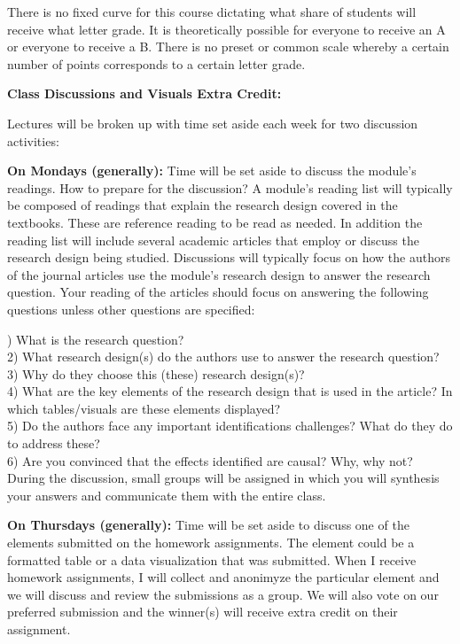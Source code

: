 \documentclass[a4paper, 10pt]{article}
\begin{document}
\noindent There is no fixed curve for this course dictating what share of students will receive what letter grade. It is theoretically possible for everyone to receive an A or everyone to receive a B. There is no preset or common scale whereby a certain number of points corresponds to a certain letter grade.  

\noindent\textbf{Class Discussions and Visuals Extra Credit:}

\noindent Lectures will be broken up with time set aside each week for two discussion activities:
 
\noindent \textbf{On Mondays (generally):} Time will be set aside to discuss the module's readings. 
How to prepare for the discussion? A module's reading list will typically be composed of readings that explain the research design covered in the textbooks. These are reference reading to be read as needed. In addition the reading list will include several academic articles that employ or discuss the research design being studied. Discussions will typically focus on how the authors of the journal articles use the module's research design to answer the research question. Your reading of the articles should focus on answering the following questions unless other questions are specified:

) What is the research question?\\
2) What research design(s) do the authors use to answer the research question? \\
3) Why do they choose this (these) research design(s)?\\
4) What are the key elements of the research design that is used in the article? In which tables/visuals are these elements displayed?\\
5) Do the authors face any important identifications challenges? What do they do to address these?\\
6) Are you convinced that the effects identified are causal? Why, why not?\\

\noindent During the discussion, small groups will be assigned in which you will synthesis your answers and communicate them with the entire class. 

\noindent \textbf{On Thursdays (generally):} Time will be set aside to discuss one of the elements submitted on the homework assignments. The element could be a formatted table or a data visualization that was submitted. When I receive homework assignments, I will collect and anonimyze the particular element and we will discuss and review the submissions as a group. We will also vote on our preferred submission and the winner(s) will receive extra credit on their assignment. 
\end{document}
